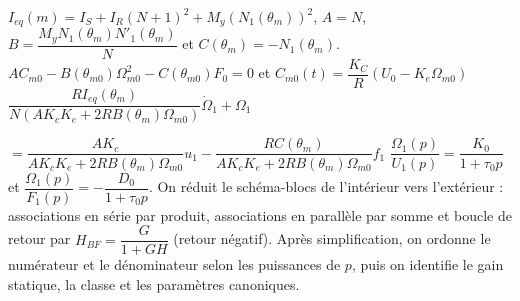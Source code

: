 \begin{corrigebox}[Corrigé]
$I_{eq}(m)=I_S+I_R\left(N+1\right)^2+M_y\left(N_1\left(\theta_m\right)\right)^2$, $A=N$, $B=\dfrac{M_y N_1\left( \theta_m\right)N'_1\left( \theta_m\right)}{N}$ et $C\left( \theta_m\right)=-N_1\left( \theta_m\right)$.
$AC_{m0}-B\left( \theta_{m0}\right) \Omega_{m0}^2-C\left( \theta_{m0}\right)F_0 = 0 $ et $C_{m0}(t)=\dfrac{K_C}{R}\left(U_0-K_e\Omega_{m0}\right)$
$\dfrac{RI_{eq}\left( \theta_m\right)}{N\left( AK_cK_e+2RB\left( \theta_m\right)\Omega_{m0}\right)} \dot{\Omega}_1+\Omega_1 $

 $= 
\dfrac{AK_c}{ AK_cK_e+2RB\left( \theta_m\right)\Omega_{m0}} u_1
- \dfrac{RC\left( \theta_m\right)}{ AK_cK_e+2RB\left( \theta_m\right)\Omega_{m0}} f_1$
$\dfrac{\Omega_1(p)}{U_1(p)}=\dfrac{K_0}{1+\tau_0 p}$ et $\dfrac{\Omega_1(p)}{F_1(p)}=-\dfrac{D_0}{1+\tau_0 p}$.
On réduit le schéma-blocs de l'intérieur vers l'extérieur : associations en série par produit, associations en parallèle par somme et boucle de retour par $H_{BF}=\dfrac{G}{1+GH}$ (retour négatif). Après simplification, on ordonne le numérateur et le dénominateur selon les puissances de $p$, puis on identifie le gain statique, la classe et les paramètres canoniques.
\end{corrigebox}
